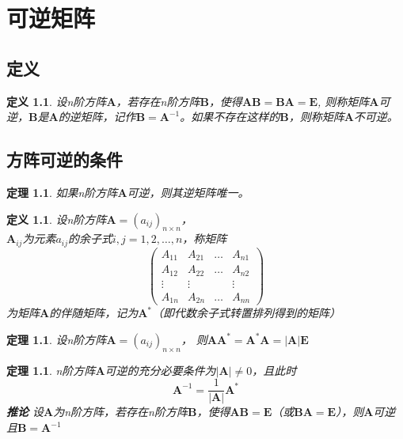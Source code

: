 \documentclass[12pt,oneside]{ctexbook}
\newtheorem{definition}[subsection]{定义}
\newtheorem{theorem}[subsection]{定理}
\begin{document}
\chapter{可逆矩阵}
\section{定义}
\begin{definition}
    设n阶方阵\(\mathbf{A}\)，若存在n阶方阵\(\mathbf{B}\)，使得\(\mathbf{A}\mathbf{B}=\mathbf{B}\mathbf{A}=\mathbf{E}\),
    则称矩阵\(\mathbf{A}\)可逆，\(\mathbf{B}\)是\(\mathbf{A}\)的逆矩阵，记作\(\mathbf{B}=\mathbf{A}^{-1}\)。如果不存在这样的\(\mathbf{B}\)，则称矩阵\(\mathbf{A}\)不可逆。
\end{definition}

\section{方阵可逆的条件}
\begin{theorem}
    如果n阶方阵\(\mathbf{A}\)可逆，则其逆矩阵唯一。
\end{theorem}

\begin{definition}
    设n阶方阵\(\mathbf{A}=(a_{ij})_{n\times n}\)，
    \\ \(\mathbf{A}_{ij}\)为元素\(a_{ij}\)的余子式\(i,j=1,2, \dots ,n\)，称矩阵
    \[\begin{pmatrix}
        A_{11}&A_{21}&\dots&A_{n1}
        \\A_{12}&A_{22}&\dots&A_{n2}
        \\\vdots&\vdots&&\vdots
        \\A_{1n}&A_{2n}&\dots&A_{nn}
    \end{pmatrix}\]
    为矩阵\(\mathbf{A}\)的伴随矩阵，记为\(\mathbf{A}^{*}\)（即代数余子式转置排列得到的矩阵）
\end{definition}
\begin{theorem}
    设n阶方阵\(\mathbf{A}=(a_{ij})_{n\times n}\)，
    则\(\mathbf{A}\mathbf{A}^*=\mathbf{A}^*\mathbf{A}=\rvert \mathbf{A}\rvert\mathbf{E}\)
\end{theorem}
\begin{theorem}
    n阶方阵\(\mathbf{A}\)可逆的充分必要条件为\(\rvert \mathbf{A} \rvert \neq 0\)，且此时
    \[\mathbf{A}^{-1}=\frac{1}{\rvert \mathbf{A} \rvert} \mathbf{A}^*\]
    \textbf{推论} 设\(\mathbf{A}\)为n阶方阵，若存在n阶方阵\(\mathbf{B}\)，使得\(\mathbf{A}\mathbf{B}=\mathbf{E}\)（或\(\mathbf{B}\mathbf{A}=\mathbf{E}\)），则\(\mathbf{A}\)可逆且\(\mathbf{B}=\mathbf{A}^{-1}\)
\end{theorem}
\end{document}

